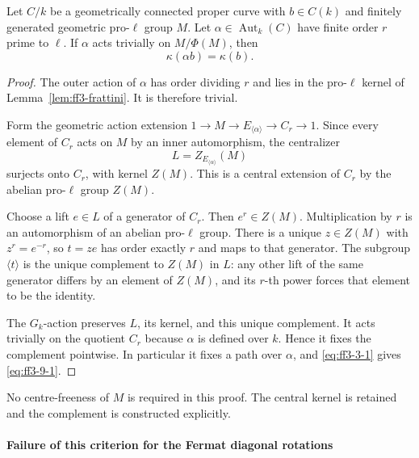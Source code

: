 \begin{lemma}
\label{lem:ff3-trivial-residual}

Let \(C/k\) be a geometrically connected proper curve with \(b\in C(k)\) and finitely generated geometric pro-\(\ell\) group \(M\). Let \(\alpha\in\operatorname{Aut}_k(C)\) have finite order \(r\) prime to \(\ell\). If \(\alpha\) acts trivially on \(M/\Phi(M)\), then \begin{equation}
\kappa(\alpha b)=\kappa(b).
\label{eq:ff3-9-1}
\end{equation}

\end{lemma}
\begin{proof}

The outer action of \(\alpha\) has order dividing \(r\) and lies in the pro-\(\ell\) kernel of Lemma~\ref{lem:ff3-frattini}. It is therefore trivial.

Form the geometric action extension \(1\to M\to E_{\langle\alpha\rangle}\to C_r\to1\). Since every element of \(C_r\) acts on \(M\) by an inner automorphism, the centralizer \[
 L=Z_{E_{\langle\alpha\rangle}}(M)
\] surjects onto \(C_r\), with kernel \(Z(M)\). This is a central extension of \(C_r\) by the abelian pro-\(\ell\) group \(Z(M)\).

Choose a lift \(e\in L\) of a generator of \(C_r\). Then \(e^r\in Z(M)\). Multiplication by \(r\) is an automorphism of an abelian pro-\(\ell\) group. There is a unique \(z\in Z(M)\) with \(z^r=e^{-r}\), so \(t=ze\) has order exactly \(r\) and maps to that generator. The subgroup \(\langle t\rangle\) is the unique complement to \(Z(M)\) in \(L\): any other lift of the same generator differs by an element of \(Z(M)\), and its \(r\)-th power forces that element to be the identity.

The \(G_k\)-action preserves \(L\), its kernel, and this unique complement. It acts trivially on the quotient \(C_r\) because \(\alpha\) is defined over \(k\). Hence it fixes the complement pointwise. In particular it fixes a path over \(\alpha\), and \eqref{eq:ff3-3-1} gives \eqref{eq:ff3-9-1}.

\end{proof}

No centre-freeness of \(M\) is required in this proof. The central kernel is retained and the complement is constructed explicitly.

\paragraph{Failure of this criterion for the Fermat diagonal rotations}

